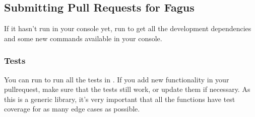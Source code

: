 \documentclass[a4paper,10pt,english]{sphinxmanual}
\begin{document}
\subsection{Submitting Pull Requests for Fagus}
\label{\detokenize{CONTRIBUTING:submitting-pull-requests-for-fagus}}
\sphinxAtStartPar
If it hasn’t run in your console yet, run  to get all the development dependencies and some new commands available in your console.


\subsubsection{Tests}
\label{\detokenize{CONTRIBUTING:tests}}
\sphinxAtStartPar
You can run  to run all the tests in . If you add new functionality in your pull\sphinxhyphen{}request, make sure that the tests still work, or update them if necessary. As this is a generic library, it’s very important that all the functions have test coverage for as many edge cases as possible.
\end{document}
